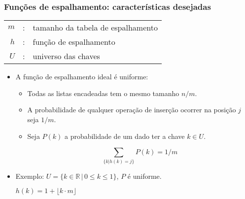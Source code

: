 \documentclass{beamer}
\begin{document}
\begin{frame}

\frametitle{Funções de espalhamento: características desejadas}

\begin{tabular}{rcl}
  $m$ & : & tamanho da tabela de espalhamento \\
  $h$ & : & função de espalhamento \\
  $U$ & : & universo das chaves \\
\end{tabular}

\begin{itemize}

  \item A função de espalhamento \alert{ideal} é uniforme:

    \begin{itemize}

    \item Todas as listas encadeadas tem o mesmo tamanho $n / m$.

    \item A probabilidade de qualquer operação de inserção ocorrer na posição $j$ seja $1 / m$.

    \item Seja $P(k)$ a probabilidade de um dado ter a chave $k \in U$.

      $$\sum_{\{ k | h(k) = j \}} P(k) = 1/m$$

    \end{itemize}

  \item Exemplo: $U = \{ k \in \mathbb{R} \,|\, 0 \le k \le 1 \}$, $P$ é uniforme.

    $h(k) = 1 + \lfloor k \cdot m \rfloor$

\end{itemize}

\end{frame}
\end{document}
